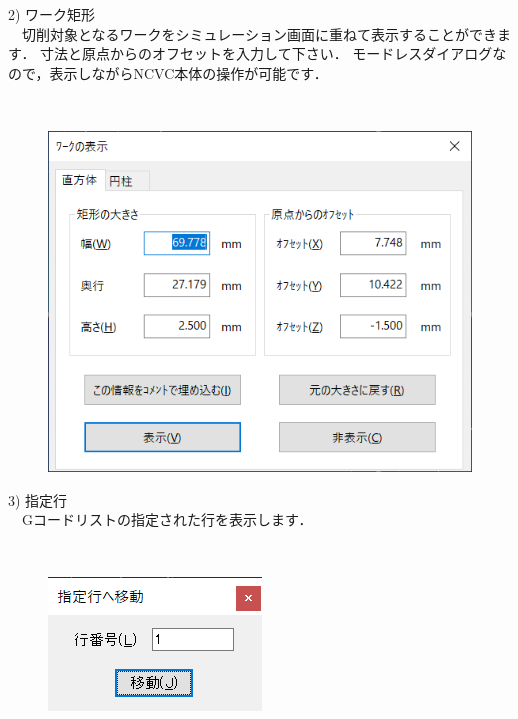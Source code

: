 \begin{minipage}[t]{0.48\textwidth}
2) ワーク矩形\label{sec:maxrect}\\
　切削対象となるワークをシミュレーション画面に重ねて表示することができます．
寸法と原点からのオフセットを入力して下さい．
モードレスダイアログなので，表示しながらNCVC本体の操作が可能です．
\end{minipage}
\begin{minipage}[t]{0.02\textwidth}
　
\end{minipage}
\begin{minipage}[t]{0.5\textwidth}
\vspace*{-2zh}
\begin{figure}[H]
\centering
\includegraphics[width=\textwidth]{No6/fig/nc-workrect.png}
\label{fig:nc-workrect.png}
\end{figure}
\end{minipage}

\begin{minipage}[t]{0.58\textwidth}
3) 指定行\label{sec:jump}\\
　Gコードリストの指定された行を表示します．
\end{minipage}
\begin{minipage}[t]{0.02\textwidth}
　
\end{minipage}
\begin{minipage}[t]{0.4\textwidth}
\vspace*{-2zh}
\begin{figure}[H]
\centering
\includegraphics{No6/fig/nc-jump.png}
\label{fig:nc-jump.png}
\end{figure}
\end{minipage}
